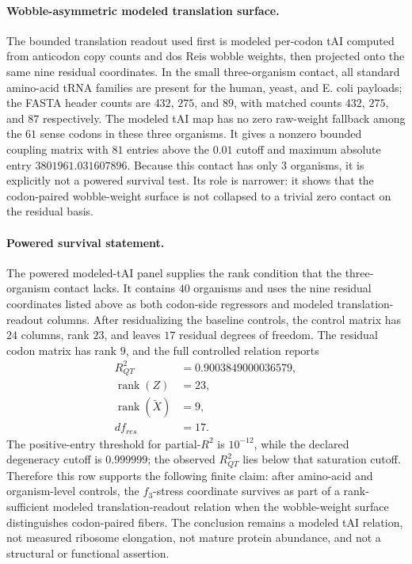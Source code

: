 \paragraph{Wobble-asymmetric modeled translation surface.}
The bounded translation readout used first is modeled per-codon tAI computed from anticodon copy counts and dos Reis wobble weights, then projected onto the same nine residual coordinates.  In the small three-organism contact, all standard amino-acid tRNA families are present for the human, yeast, and E. coli payloads; the FASTA header counts are $432$, $275$, and $89$, with matched counts $432$, $275$, and $87$ respectively.  The modeled tAI map has no zero raw-weight fallback among the $61$ sense codons in these three organisms.  It gives a nonzero bounded coupling matrix with $81$ entries above the $0.01$ cutoff and maximum absolute entry $3801961.031607896$.  Because this contact has only $3$ organisms, it is explicitly not a powered survival test.  Its role is narrower: it shows that the codon-paired wobble-weight surface is not collapsed to a trivial zero contact on the residual basis.

\paragraph{Powered survival statement.}
The powered modeled-tAI panel supplies the rank condition that the three-organism contact lacks.  It contains $40$ organisms and uses the nine residual coordinates listed above as both codon-side regressors and modeled translation-readout columns.  After residualizing the baseline controls, the control matrix has $24$ columns, rank $23$, and leaves $17$ residual degrees of freedom.  The residual codon matrix has rank $9$, and the full controlled relation reports
$$
\begin{aligned}
  R^2_{QT} &= 0.9003849000036579,\\
  \operatorname{rank}(Z) &= 23,\\
  \operatorname{rank}(\widetilde X) &= 9,\\
  df_{res} &= 17.
\end{aligned}
$$
The positive-entry threshold for partial-$R^2$ is $10^{-12}$, while the declared degeneracy cutoff is $0.999999$; the observed $R^2_{QT}$ lies below that saturation cutoff.  Therefore this row supports the following finite claim: after amino-acid and organism-level controls, the $f_3$-stress coordinate survives as part of a rank-sufficient modeled translation-readout relation when the wobble-weight surface distinguishes codon-paired fibers.  The conclusion remains a modeled tAI relation, not measured ribosome elongation, not mature protein abundance, and not a structural or functional assertion.

